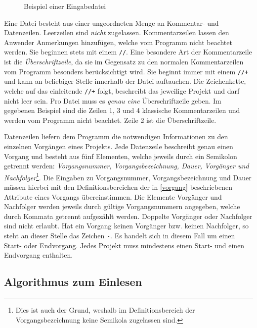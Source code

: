 \begin{figure}[h!]
  \resizebox{\textwidth}{!}{
    \fbox{
      \setlength{\fboxrule}{1pt}
      
    }
  }
  \caption{Beispiel einer Eingabedatei}
\end{figure}
Eine Datei besteht aus einer ungeordneten Menge an Kommentar- und
Datenzeilen. Leerzeilen sind \textit{nicht}
zugelassen. Kommentarzeilen lassen den Anwender Anmerkungen
hinzuf\"ugen, welche vom Programm nicht beachtet werden. Sie beginnen
stets mit einem \texttt{//}. Eine besondere Art der Kommentarzeile ist
die \textit{\"Uberschriftzeile}, da sie im Gegensatz zu den normalen
Kommentarzeilen vom Programm besonders ber\"ucksichtigt wird. Sie
beginnt immer mit einem \texttt{//+} und kann an beliebiger Stelle
innerhalb der Datei auftauchen. Die Zeichenkette, welche auf das
einleitende \texttt{//+} folgt, beschreibt das jeweilige Projekt und
darf nicht leer sein. Pro Datei muss es \textit{genau eine}
\"Uberschriftzeile geben. Im gegebenen Beispiel sind die Zeilen 1, 3
und 4 klassische Kommentarzeilen und werden vom Programm nicht
beachtet. Zeile 2 ist die \"Uberschriftzeile.

Datenzeilen liefern dem Programm die notwendigen Informationen zu den
einzelnen Vorg\"angen eines Projekts. Jede Datenzeile beschreibt genau
einen Vorgang und besteht aus f\"unf Elementen, welche jeweils durch
ein Semikolon getrennt werden: \textit{Vorgangsnummer,
  Vorgangsbezeichnung, Dauer, Vorg\"anger und
  Nachfolger}\footnote{Dies ist auch der Grund, weshalb im
  Definitionsbereich der Vorgangsbezeichnung keine Semikola zugelassen
  sind.}.
Die Eingaben zu Vorgangsnummer, Vorgangsbezeichnung und Dauer m\"ussen
hierbei mit den Definitionsbereichen der in \ref{vorgang} beschriebenen Attribute
eines Vorgangs \"ubereinstimmen. Die Elemente Vorg\"anger und
Nachfolger werden jeweils durch g\"ultige Vorgangsnummern angegeben,
welche durch Kommata getrennt aufgez\"ahlt werden. Doppelte
Vorg\"anger oder Nachfolger sind nicht erlaubt. Hat ein Vorgang
keinen Vorg\"anger bzw. keinen Nachfolger, so steht an dieser Stelle
das Zeichen \texttt{-}. Es handelt sich in diesem Fall um einen Start-
oder Endvorgang. Jedes Projekt muss mindestens einen Start- und einen
Endvorgang enthalten.

\subsection{Algorithmus zum Einlesen}

